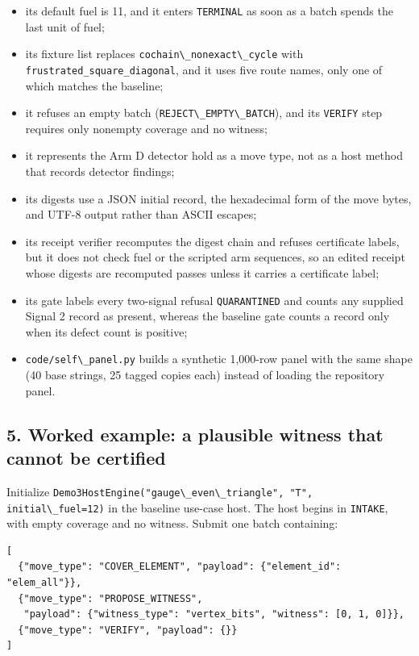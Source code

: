 \documentclass[
  11pt,
]{article}
\newcommand{\passthrough}[1]{#1}
\providecommand{\tightlist}{%
  \setlength{\itemsep}{0pt}\setlength{\parskip}{0pt}}
\begin{document}
\begin{itemize}
\tightlist
\item
  its default fuel is 11, and it enters
  \passthrough{\lstinline!TERMINAL!} as soon as a batch spends the last
  unit of fuel;
\item
  its fixture list replaces
  \passthrough{\lstinline!cochain\_nonexact\_cycle!} with
  \nolinkurl{frustrated_square_diagonal}, and it uses five route names,
  only one of which matches the baseline;
\item
  it refuses an empty batch
  (\passthrough{\lstinline!REJECT\_EMPTY\_BATCH!}), and its
  \passthrough{\lstinline!VERIFY!} step requires only nonempty coverage
  and no witness;
\item
  it represents the Arm D detector hold as a move type, not as a host
  method that records detector findings;
\item
  its digests use a JSON initial record, the hexadecimal form of the
  move bytes, and UTF-8 output rather than ASCII escapes;
\item
  its receipt verifier recomputes the digest chain and refuses
  certificate labels, but it does not check fuel or the scripted arm
  sequences, so an edited receipt whose digests are recomputed passes
  unless it carries a certificate label;
\item
  its gate labels every two-signal refusal
  \passthrough{\lstinline!QUARANTINED!} and counts any supplied Signal 2
  record as present, whereas the baseline gate counts a record only when
  its defect count is positive;
\item
  \passthrough{\lstinline!code/self\_panel.py!} builds a synthetic
  1,000-row panel with the same shape (40 base strings, 25 tagged copies
  each) instead of loading the repository panel.
\end{itemize}

\subsection{5. Worked example: a plausible witness that cannot be
certified}\label{worked-example-a-plausible-witness-that-cannot-be-certified}

Initialize
\passthrough{\lstinline!Demo3HostEngine("gauge\_even\_triangle", "T", initial\_fuel=12)!}
in the baseline use-case host. The host begins in
\passthrough{\lstinline!INTAKE!}, with empty coverage and no witness.
Submit one batch containing:

\begin{lstlisting}
[
  {"move_type": "COVER_ELEMENT", "payload": {"element_id": "elem_all"}},
  {"move_type": "PROPOSE_WITNESS",
   "payload": {"witness_type": "vertex_bits", "witness": [0, 1, 0]}},
  {"move_type": "VERIFY", "payload": {}}
]
\end{lstlisting}
\end{document}
